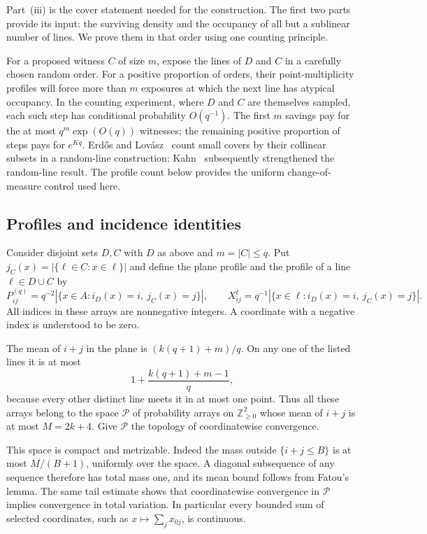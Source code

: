 Part~\textup{(iii)} is the cover statement needed for the construction.
The first two parts provide its input: the surviving density and the
occupancy of all but a sublinear number of lines. We prove them in that
order using one counting principle.

For a proposed witness $C$ of size $m$, expose the lines of $D$ and $C$
in a carefully chosen random order. For a positive proportion of orders,
their point-multiplicity profiles will force more than $m$ exposures at
which the next line has atypical occupancy. In the counting experiment,
where $D$ and $C$ are themselves sampled, each such step has conditional
probability $O(q^{-1})$.
The first $m$ savings pay for the at most $q^m\exp(O(q))$ witnesses;
the remaining positive proportion of steps pays for $e^{Kq}$.
Erd\H{o}s and Lov\'asz~\cite[Section~4]{ErdosLovasz1975} count small
covers by their collinear subsets in a random-line construction;
Kahn~\cite{Kahn1992} subsequently strengthened the random-line result.
The profile count below provides the uniform change-of-measure control
used here.

\subsection{Profiles and incidence identities}

Consider disjoint sets $D,C$ with $D$ as above and $m=|C|\le q$.  Put
$j_C(x)=|\{\ell\in C:x\in\ell\}|$ and define the plane profile and the
profile of a line $\ell\in D\cup C$ by
\[
 P^{(q)}_{ij}=q^{-2}|\{x\in A:i_D(x)=i,\ j_C(x)=j\}|,
 \qquad
 X^\ell_{ij}=q^{-1}|\{x\in\ell:i_D(x)=i,\ j_C(x)=j\}|.
\]
All indices in these arrays are nonnegative integers.  A coordinate with
a negative index is understood to be zero.

The mean of $i+j$ in the plane is $(k(q+1)+m)/q$.  On any one of the
listed lines it is at most
\[
 1+\frac{k(q+1)+m-1}{q},
\]
because every other distinct line meets it in at most one point.  Thus
all these arrays belong to the space $\mathscr P$ of probability arrays
on $\mathbb Z_{\ge0}^2$ whose mean of $i+j$ is at most $M=2k+4$.
Give $\mathscr P$ the topology of coordinatewise convergence.

This space is compact and metrizable.  Indeed the mass outside
$\{i+j\le B\}$ is at most $M/(B+1)$, uniformly over the space.  A diagonal
subsequence of any sequence therefore has total mass one, and its mean
bound follows from Fatou's lemma.  The same tail estimate shows that
coordinatewise convergence in $\mathscr P$ implies convergence in total
variation.  In particular every bounded sum of selected coordinates,
such as $x\mapsto\sum_jx_{0j}$, is continuous.

